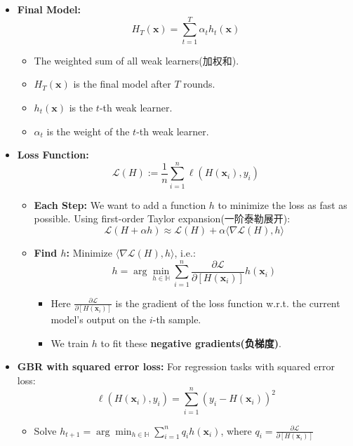 \documentclass[UTF8]{ctexart}
\begin{document}
\begin{itemize}
    \item \textbf{Final Model:} \[H_T(\mathbf{x}) = \sum_{t=1}^{T} \alpha_t h_t(\mathbf{x})\]
    
    \begin{itemize}
        \item The weighted sum of all weak learners(加权和).
        \item $H_T(\mathbf{x})$ is the final model after $T$ rounds.
        \item $h_t(\mathbf{x})$ is the $t$-th weak learner.
        \item $\alpha_t$ is the weight of the $t$-th weak learner.
    \end{itemize}
    
    \item \textbf{Loss Function:} \[\mathcal{L}(H) := \frac{1}{n} \sum_{i=1}^{n} \ell(H(\mathbf{x}_i), y_i)\]

    \begin{itemize}
        \item \textbf{Each Step:} We want to add a function $h$ to minimize the loss as fast as possible. Using first-order Taylor expansion(一阶泰勒展开):
        \[
        \mathcal{L}(H + \alpha h) \approx \mathcal{L}(H) + \alpha \langle \nabla \mathcal{L}(H), h \rangle
        \]
        
        \item \textbf{Find $h$:} Minimize $\langle \nabla \mathcal{L}(H), h \rangle$, i.e.:
        \[
        h = \arg\min_{h \in \mathbb{H}} \sum_{i=1}^{n} \frac{\partial \mathcal{L}}{\partial [H(\mathbf{x}_i)]} h(\mathbf{x}_i)
        \]
        
        \begin{itemize}
            \item Here $\frac{\partial \mathcal{L}}{\partial [H(\mathbf{x}_i)]}$ is the gradient of the loss function w.r.t. the current model's output on the $i$-th sample.
            \item We train $h$ to fit these \textbf{negative gradients(负梯度)}. 
        \end{itemize}
       
        
    \end{itemize}
     \item \textbf{GBR with squared error loss: } For regression tasks with squared error loss:
     \[\ell(H(\mathbf{x}_i), y_i) = \sum_{i=1}^n (y_i - H(\mathbf{x}_i))^2\]
        \begin{itemize}
            \item Solve $h_{t+1} = \arg\min_{h \in \mathbb{H}} \sum_{i=1}^{n} q_i h(\mathbf{x}_i)$, where $q_i = \frac{\partial \mathcal{L}}{\partial [H(\mathbf{x}_i)]}$
            

\end{itemize}
\end{itemize}
\end{document}
